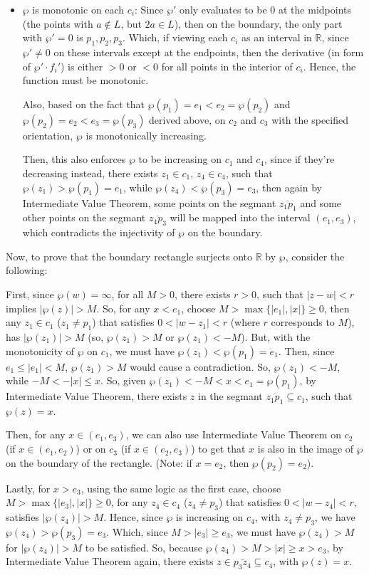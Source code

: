 \documentclass{article}
\begin{document}
\begin{itemize}
\begin{itemize}
        \item $\wp$ is monotonic on each $c_i$: Since $\wp'$ only evaluates to be $0$ at the midpoints (the points with $a\notin L$, but $2a\in L$), then on the boundary, the only part with $\wp'=0$ is $p_1,p_2,p_3$. Which, if viewing each $c_i$ as an interval in $\mathbb{R}$, since $\wp'\neq 0$ on these intervals except at the endpoints, then the derivative (in form of $\wp' \cdot f_i'$) is either $>0$ or $<0$ for all points in the interior of $c_i$. Hence, the function must be monotonic.
        
        Also, based on the fact that $\wp(p_1)=e_1<e_2=\wp(p_2)$ and $\wp(p_2)=e_2<e_3=\wp(p_3)$ derived above, on $c_2$ and $c_3$ with the specified orientation, $\wp$ is monotonically increasing.

        Then, this also enforces $\wp$ to be increasing on $c_1$ and $c_4$, since if they're decreasing instead, there exists $z_1\in c_1$, $z_4\in c_4$, such that $\wp(z_1)>\wp(p_1)=e_1$, while $\wp(z_4)<\wp(p_3)=e_3$, then again by Intermediate Value Theorem, some points on the segmant $\overline{z_1p_1}$ and some other points on the segmant $\overline{z_4p_3}$ will be mapped into the interval $(e_1,e_3)$, which contradicts the injectivity of $\wp$ on the boundary.
    \end{itemize}

    Now, to prove that the boundary rectangle surjects onto $\mathbb{R}$ by $\wp$, consider the following:

    First, since $\wp(w)=\infty$, for all $M>0$, there exists $r>0$, such that $|z-w|<r$ implies $|\wp(z)|>M$. So, for any $x<e_1$, choose $M>\max\{|e_1|,|x|\}\geq 0$, then any $z_1\in c_1$ ($z_1\neq p_1$) that satisfies $0<|w-z_1|<r$ (where $r$ corresponds to $M$), has $|\wp(z_1)|>M$ (so, $\wp(z_1)>M$ or $\wp(z_1)<-M$). But, with the monotonicity of $\wp$ on $c_1$, we must have $\wp(z_1)<\wp(p_1)=e_1$. Then, since $e_1\leq |e_1|<M$, $\wp(z_1)>M$ would cause a contradiction. So, $\wp(z_1)<-M$, while $-M<-|x|\leq x$. So, given $\wp(z_1)<-M<x<e_1 = \wp(p_1)$, by Intermediate Value Theorem, there exists $z$ in the segmant $\overline{z_1 p_1}\subseteq c_1$, such that $\wp(z)=x$.
    
    Then, for any $x\in (e_1,e_3)$, we can also use Intermediate Value Theorem on $c_2$ (if $x\in (e_1,e_2)$) or on $c_3$ (if $x\in (e_2,e_3)$) to get that $x$ is also in the image of $\wp$ on the boundary of the rectangle. (Note: if $x=e_2$, then $\wp(p_2)=e_2$).

    Lastly, for $x>e_3$, using the same logic as the first case, choose $M>\max\{|e_3|,|x|\}\geq 0$, for any $z_4\in c_4$ ($z_4\neq p_3$) that satisfies $0<|w-z_4|<r$, satisfies $|\wp(z_4)|>M$. Hence, since $\wp$ is increasing on $c_4$, with $z_4\neq p_3$, we have $\wp(z_4)>\wp(p_3)=e_3$. Which, since $M>|e_3|\geq e_3$, we must have $\wp(z_4)>M$ for $|\wp(z_4)|>M$ to be satisfied.
    So, because $\wp(z_4)>M>|x|\geq x > e_3$, by Intermediate Value Theorem again, there exists $z\in \overline{p_3z_4}\subseteq c_4$, with $\wp(z)=x$. 


\end{itemize}
\end{document}
